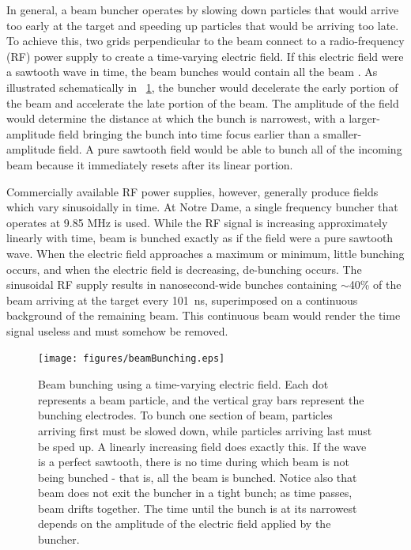 In general, a beam buncher operates by slowing down particles that would arrive too early at the target and speeding up particles that would be arriving too late.  To achieve this, two grids perpendicular to the beam connect to a radio-frequency (RF) power supply to create a time-varying electric field.  If this electric field were a sawtooth wave in time, the beam bunches would contain all the beam \citep{LynchBunching}.  As illustrated schematically in {\fig}~\ref{fig:bunching}, the buncher would decelerate the early portion of the beam and accelerate the late portion of the beam.  The amplitude of the field would determine the distance at which the bunch is narrowest, with a larger-amplitude field bringing the bunch into time focus earlier than a smaller-amplitude field.  A pure sawtooth field would be able to bunch all of the incoming beam because it immediately resets after its linear portion.  

Commercially available RF power supplies, however, generally produce fields which vary sinusoidally in time.  At Notre Dame, a single frequency buncher that operates at 9.85 MHz is used.  While the RF signal is increasing approximately linearly with time, beam is bunched exactly as if the field were a pure sawtooth wave.  When the electric field approaches a maximum or minimum, little bunching occurs, and when the electric field is decreasing, de-bunching occurs.  The sinusoidal RF supply results in nanosecond-wide bunches containing $\sim$40\% of the beam arriving at the target every 101~ns, superimposed on a continuous background of the remaining beam.  This continuous beam would render the time signal useless and must somehow be removed.

\begin{figure}[htp]
\centering
\texttt{[image: figures/beamBunching.eps]}
\caption[Beam bunching.]{Beam bunching using a time-varying electric field.  Each dot represents a beam particle, and the vertical gray bars represent the bunching electrodes.  To bunch one section of beam, particles arriving first must be slowed down, while particles arriving last must be sped up.  A linearly increasing field does exactly this.  If the wave is a perfect sawtooth, there is no time during which beam is not being bunched - that is, all the beam is bunched.  Notice also that beam does not exit the buncher in a tight bunch; as time passes, beam drifts together.  The time until the bunch is at its narrowest depends on the amplitude of the electric field applied by the buncher.}
\label{fig:bunching}
\end{figure}

